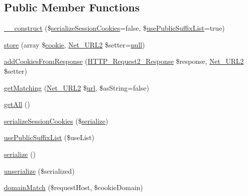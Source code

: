\subsection*{Public Member Functions}
\begin{DoxyCompactItemize}
\item 
\hyperlink{classHTTP__Request2__CookieJar_a0df8fa6c7a4d383b595fa62a62d280f1}{\+\_\+\+\_\+construct} (\$\hyperlink{classHTTP__Request2__CookieJar_a2a81535d5a9762c3d6ae9229f2349813}{serialize\+Session\+Cookies}=false, \$\hyperlink{classHTTP__Request2__CookieJar_aa5754da6e9d23db800e091bc16fb3bc8}{use\+Public\+Suffix\+List}=true)
\item 
\hyperlink{classHTTP__Request2__CookieJar_a282b74d495d895691cf2dd4e7a7d467e}{store} (array \$\hyperlink{jquery_8cookie_8js_afabd817194187de2e22c008dcedc6e9a}{cookie}, \hyperlink{classNet__URL2}{Net\+\_\+\+U\+R\+L2} \$setter=\hyperlink{modernizr_8min_8js_a286f9ec831c5e676eeb493248eab9575}{null})
\item 
\hyperlink{classHTTP__Request2__CookieJar_ac36b125ea28edd3383bfc7122bfe3492}{add\+Cookies\+From\+Response} (\hyperlink{classHTTP__Request2__Response}{H\+T\+T\+P\+\_\+\+Request2\+\_\+\+Response} \$response, \hyperlink{classNet__URL2}{Net\+\_\+\+U\+R\+L2} \$setter)
\item 
\hyperlink{classHTTP__Request2__CookieJar_a1a5ded22296cb2445004e579b8f38eab}{get\+Matching} (\hyperlink{classNet__URL2}{Net\+\_\+\+U\+R\+L2} \$\hyperlink{swfupload_8js_a440a52a9004fdab0700100a6ddb49f67}{url}, \$as\+String=false)
\item 
\hyperlink{classHTTP__Request2__CookieJar_ac38ab1d49f98cb8261b3fe8eeb482125}{get\+All} ()
\item 
\hyperlink{classHTTP__Request2__CookieJar_a2a81535d5a9762c3d6ae9229f2349813}{serialize\+Session\+Cookies} (\$\hyperlink{classHTTP__Request2__CookieJar_ac6fa68d8621d1aef56c0eb8231612839}{serialize})
\item 
\hyperlink{classHTTP__Request2__CookieJar_aa5754da6e9d23db800e091bc16fb3bc8}{use\+Public\+Suffix\+List} (\$use\+List)
\item 
\hyperlink{classHTTP__Request2__CookieJar_ac6fa68d8621d1aef56c0eb8231612839}{serialize} ()
\item 
\hyperlink{classHTTP__Request2__CookieJar_ae63b138701ec28ec7f7c7a2b90f0a3a7}{unserialize} (\$serialized)
\item 
\hyperlink{classHTTP__Request2__CookieJar_ad22bee9ce6d2c111120bf44c3e302401}{domain\+Match} (\$request\+Host, \$cookie\+Domain)
\end{DoxyCompactItemize}
